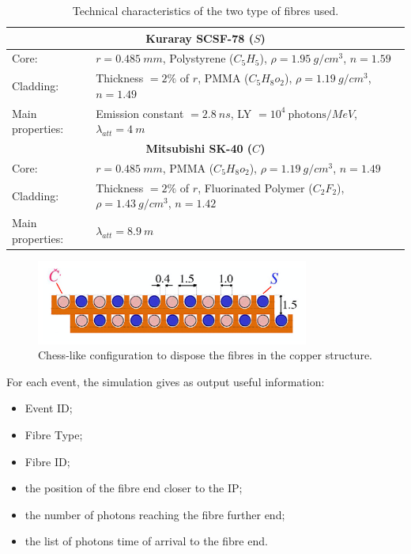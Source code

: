 \begin{table}
	\centering
	\setlength{\tabcolsep}{12pt}
	\begin{tabular}{lp{}}
		\toprule
		\multicolumn{2}{c}{\textbf{Kuraray SCSF-78 ($S$)}}	\\
		\midrule
		Core:				& $r = 0.485\ mm$, Polystyrene ($C_5H_5$), $\rho=1.95\ g/cm^3$, $n = 1.59$	\\
		Cladding: 			& Thickness $=2\%$ of $r$, PMMA ($C_5H_8o_2$), $\rho=1.19\ g/cm^3$, $n=1.49$	\\
		Main properties:	& Emission constant $= 2.8\ ns$, LY $= 10^4\ \text{photons}/MeV$, $\lambda_{att} = 4\ m$	\\
		\midrule
		\multicolumn{2}{c}{\textbf{Mitsubishi SK-40 ($C$)}}	\\
		\midrule
		Core:				& $r = 0.485\ mm$, PMMA ($C_5H_8o_2$), $\rho=1.19\ g/cm^3$, $n = 1.49$	\\
		Cladding: 			& Thickness $=2\%$ of $r$, Fluorinated Polymer ($C_2F_2$), $\rho=1.43\ g/cm^3$, $n=1.42$	\\
		Main properties:	& $\lambda_{att} = 8.9\ m$	\\
		\bottomrule
	\end{tabular}
	\caption{Technical characteristics of the two type of fibres used.}
	\label{tab:fibres}
\end{table}

\begin{figure}
	\centering
	\includegraphics[width=0.8\textwidth]{IMG/DRCGeometry2}
	\caption{Chess-like configuration to dispose the fibres in the copper structure.}
	\label{fig:CS_fibres}
\end{figure}

For each event, the simulation gives as output useful information: 
\begin{itemize}
	\item Event ID;
	\item Fibre Type;
	\item Fibre ID;
	\item the position of the fibre end closer to the IP;
	\item the number of photons reaching the fibre further end;
	\item the list of photons time of arrival to the fibre end.
\end{itemize}

